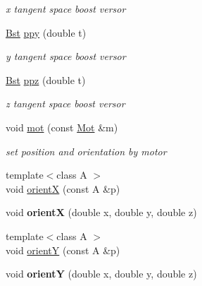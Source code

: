 \begin{DoxyCompactItemize}
\begin{DoxyCompactList}\small\item\em x tangent space boost versor \end{DoxyCompactList}\item 
\hypertarget{classvsr_1_1_frame_a1a966b08c66988893cd3b80264baea27}{\hyperlink{namespacevsr_a9f737171e19572794ba7b6c12e8e679f}{Bst} \hyperlink{classvsr_1_1_frame_a1a966b08c66988893cd3b80264baea27}{ppy} (double t)}\label{classvsr_1_1_frame_a1a966b08c66988893cd3b80264baea27}

\begin{DoxyCompactList}\small\item\em y tangent space boost versor \end{DoxyCompactList}\item 
\hypertarget{classvsr_1_1_frame_ad6aff4fc5e660e81a6206ec768834d94}{\hyperlink{namespacevsr_a9f737171e19572794ba7b6c12e8e679f}{Bst} \hyperlink{classvsr_1_1_frame_ad6aff4fc5e660e81a6206ec768834d94}{ppz} (double t)}\label{classvsr_1_1_frame_ad6aff4fc5e660e81a6206ec768834d94}

\begin{DoxyCompactList}\small\item\em z tangent space boost versor \end{DoxyCompactList}\item 
\hypertarget{classvsr_1_1_frame_a6f698306d923db5745fb818b01fd0b67}{void \hyperlink{classvsr_1_1_frame_a6f698306d923db5745fb818b01fd0b67}{mot} (const \hyperlink{namespacevsr_ad4b77d620ed90deefbeab9d4a122667e}{Mot} \&m)}\label{classvsr_1_1_frame_a6f698306d923db5745fb818b01fd0b67}

\begin{DoxyCompactList}\small\item\em set position and orientation by motor \end{DoxyCompactList}\item 
{\footnotesize template$<$class A $>$ }\\void \hyperlink{classvsr_1_1_frame_a6b6c8aea0e092a466add9a11a258ddf0}{orient\-X} (const A \&p)
\item 
\hypertarget{classvsr_1_1_frame_a1ed14b0dac76f2e26166f7b56f8e10e4}{void {\bfseries orient\-X} (double x, double y, double z)}\label{classvsr_1_1_frame_a1ed14b0dac76f2e26166f7b56f8e10e4}

\item 
{\footnotesize template$<$class A $>$ }\\void \hyperlink{classvsr_1_1_frame_a328db2b54f9f456e2549032c4ebedac8}{orient\-Y} (const A \&p)
\item 
\hypertarget{classvsr_1_1_frame_ab9dbca95ca0d05f399c02767e0a95373}{void {\bfseries orient\-Y} (double x, double y, double z)}\label{classvsr_1_1_frame_ab9dbca95ca0d05f399c02767e0a95373}


\end{DoxyCompactItemize}
